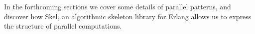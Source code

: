 In the forthcoming sections we cover some details of parallel patterns,
and discover how Skel, an algorithmic skeleton library for Erlang 
allows us to express the structure of parallel
computations. %

